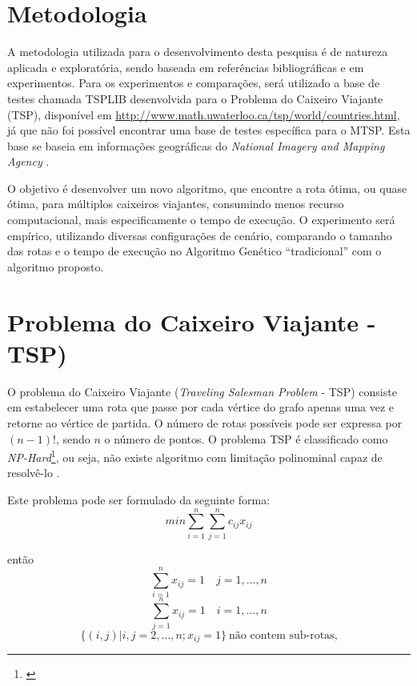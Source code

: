 \documentclass{abnt}
\begin{document}
	\chapter{Metodologia}

		A metodologia utilizada para o desenvolvimento desta pesquisa é de natureza aplicada e exploratória, sendo baseada em referências bibliográficas e em experimentos. Para os experimentos e comparações, será utilizado a base de testes chamada TSPLIB desenvolvida para o Problema do Caixeiro Viajante (TSP), disponível em \url{http://www.math.uwaterloo.ca/tsp/world/countries.html}, já que não foi possível encontrar uma base de testes específica para o MTSP. Esta base se baseia em informações geográficas do \textit{National Imagery and Mapping Agency} \cite{tsplib}.
	
		O objetivo é desenvolver um novo algoritmo, que encontre a rota ótima, ou quase ótima, para múltiplos caixeiros viajantes, consumindo menos recurso computacional, mais especificamente o tempo de execução. O experimento será empírico, utilizando diversas configurações de cenário, comparando o tamanho das rotas e o tempo de execução no Algoritmo Genético ``tradicional'' com o algoritmo proposto. 

	\chapter{Problema do Caixeiro Viajante - TSP)}
		O problema do Caixeiro Viajante (\textit{Traveling Salesman Problem} - TSP) consiste em estabelecer uma rota que passe por cada vértice do grafo apenas uma vez e retorne ao vértice de partida. O número de rotas possíveis pode ser expressa por $(n-1)!$, sendo $n$ o número de pontos.
		O problema TSP é classificado como \textit{NP-Hard}\footnote{\cite{0015-pdf}}, ou seja, não existe algoritmo com limitação polinominal capaz de resolvê-lo \cite{0010-pdf}. 
		
		Este problema pode ser formulado da seguinte forma:
		\begin{equation}
 		   	min\sum_{i=1}^{n} \sum_{j=1}^{n} c_{ij} x_{ij}
		\end{equation}
		
então		
		\begin{equation}
			\label{form}
 		   	\sum_{i=1}^{n} x_{ij} = 1 \quad j=1,\dots,n
		\end{equation}
		\begin{equation}
			\label{form-1}
 		   	\sum_{j=1}^{n} x_{ij} = 1 \quad i=1,\dots,n
		\end{equation}
		\begin{equation}
		
		\label{form-2}
 		   	\{(i,j)|i,j=2,\dots,n; x_{ij}=1\} ~\text{não contem sub-rotas,}
		\end{equation}
		
\end{document}
